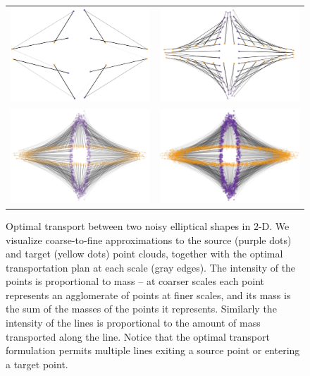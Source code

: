 \documentclass[twoside,11pt]{article}
\begin{document}
\begin{figure}[!b]
\centering
\begin{tabular}{cc}
\includegraphics[width=0.45\linewidth]{scale-3} &
\includegraphics[width=0.45\linewidth]{scale-5} \\
\includegraphics[width=0.45\linewidth]{scale-7} &
\includegraphics[width=0.45\linewidth]{scale-9} 
\end{tabular}
\caption{\label{fig:multiscale-strategy}
  Optimal transport between two noisy elliptical shapes in $2$-D. We
visualize coarse-to-fine approximations to the source (purple dots) and target
(yellow dots) point clouds, together with the optimal transportation plan at
each scale (gray edges). The intensity of the points is proportional to mass
-- at coarser scales each point represents an agglomerate of points at finer
scales, and its mass is the sum of the masses of the points it represents.
Similarly the intensity of the lines is proportional to the amount of mass
transported along the line. Notice that the optimal transport formulation
permits multiple lines exiting a source point or entering a target point.}
\end{figure}
\end{document}
